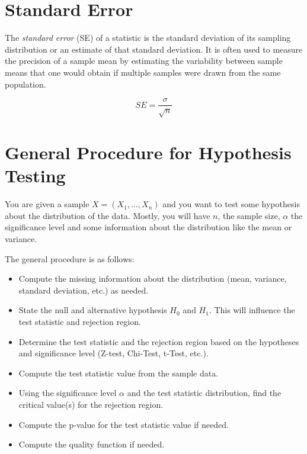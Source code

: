 \section{Standard Error}

The \emph{standard error} (SE) of a statistic is the standard deviation of its sampling distribution or an estimate of that standard deviation.
It is often used to measure the precision of a sample mean by estimating the variability between sample means that one would obtain if
multiple samples were drawn from the same population.

\[
    SE = \frac{\sigma}{\sqrt{n}}
\]

\section{General Procedure for Hypothesis Testing}

You are given a sample \(X = (X_1, \dots, X_n)\) and you want to test some hypothesis about the distribution of the data. Mostly, 
you will have \(n\), the sample size, \(\alpha\) the significance level and some information about the distribution like 
the mean or variance. 

The general procedure is as follows:

\begin{itemize}

    \item Compute the missing information about the distribution (mean, variance, standard deviation, etc.) as needed.

    \item State the null and alternative hypothesis \(H_0\) and \(H_1\). This will influence the test statistic and rejection region. 

    \item Determine the test statistic and the rejection region based on the hypotheses and significance level (Z-test, Chi-Test, t-Test, etc.). 
    
    \item Compute the test statistic value from the sample data.
    
    \item Using the significance level \(\alpha\) and the test statistic distribution, find the critical value(s) for the rejection region. 

    \item Compute the p-value for the test statistic value if needed. 
    
    \item Compute the quality function if needed.

\end{itemize}

